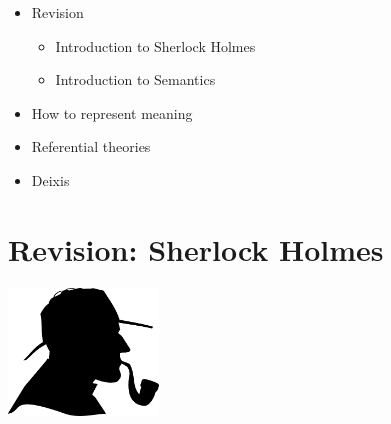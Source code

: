 \documentclass[a4paper,landscape,headrule,footrule,xetex]{foils}
\begin{document}
\maketitle

%



\begin{itemize}
\item Revision
  \begin{itemize}
  \item Introduction to Sherlock Holmes
  \item Introduction to Semantics
  \end{itemize}
\item How to represent meaning
\item Referential theories
\item Deixis

\end{itemize}








\section{Revision: Sherlock Holmes}
\begin{center}
  \includegraphics[width=0.3\textwidth]{pics/detectiveprofile}
\end{center}
\end{document}
